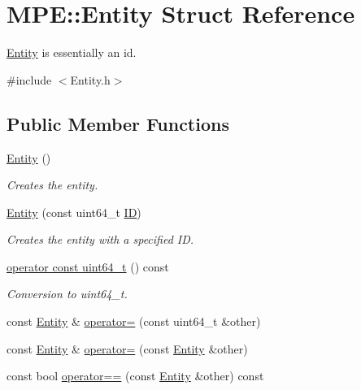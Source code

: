 \hypertarget{struct_m_p_e_1_1_entity}{}\section{M\+PE\+:\+:Entity Struct Reference}
\label{struct_m_p_e_1_1_entity}


\hyperlink{struct_m_p_e_1_1_entity}{Entity} is essentially an id.  




{\ttfamily \#include $<$Entity.\+h$>$}

\subsection*{Public Member Functions}
\begin{DoxyCompactItemize}
\item 
\hyperlink{struct_m_p_e_1_1_entity_a7a748d33b99ad088cd933578ad4533f6}{Entity} ()
\begin{DoxyCompactList}\small\item\em Creates the entity. \end{DoxyCompactList}\item 
\hyperlink{struct_m_p_e_1_1_entity_acf0e7947c1814f2984de87590963360d}{Entity} (const uint64\+\_\+t \hyperlink{struct_m_p_e_1_1_entity_a04ff49ec80c37388b0e6a75cec860ceb}{ID})
\begin{DoxyCompactList}\small\item\em Creates the entity with a specified ID. \end{DoxyCompactList}\item 
\hyperlink{struct_m_p_e_1_1_entity_a985a1dae08ed4ab82e4a0ae2263cb4a7}{operator const uint64\+\_\+t} () const
\begin{DoxyCompactList}\small\item\em Conversion to uint64\+\_\+t. \end{DoxyCompactList}\item 
const \hyperlink{struct_m_p_e_1_1_entity}{Entity} \& \hyperlink{struct_m_p_e_1_1_entity_aa48771c026e87c391bff9e75d179b538}{operator=} (const uint64\+\_\+t \&other)
\item 
const \hyperlink{struct_m_p_e_1_1_entity}{Entity} \& \hyperlink{struct_m_p_e_1_1_entity_ad356d6b8c3df7cbd8dcc24dd1a3d718d}{operator=} (const \hyperlink{struct_m_p_e_1_1_entity}{Entity} \&other)
\item 
const bool \hyperlink{struct_m_p_e_1_1_entity_a587d74654df3a9be46403264c9bb016a}{operator==} (const \hyperlink{struct_m_p_e_1_1_entity}{Entity} \&other) const
\end{DoxyCompactItemize}
